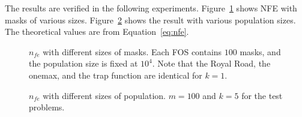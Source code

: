 \documentclass{sig-alternate}
\begin{document}
The results are verified in the following experiments.
Figure~\ref{fig:nfe_k} shows NFE with masks of various sizes.
Figure~\ref{fig:nfe_n} shows the result with various population sizes.
The theoretical values are from Equation~\ref{eq:nfe}.

\begin{figure}
\centering
{}
\caption{
$n_{fe}$ with different sizes of masks.
Each FOS contains $100$ masks, and the population size is fixed at $10^4$.
Note that the Royal Road, the onemax, and the trap function are identical for $k=1$.
}
\label{fig:nfe_k}
\end{figure}

\begin{figure}
\centering
{}
\caption{$n_{fe}$ with different sizes of population.
$m=100$ and $k=5$ for the test problems.
}
\label{fig:nfe_n}
\end{figure}
\end{document}
